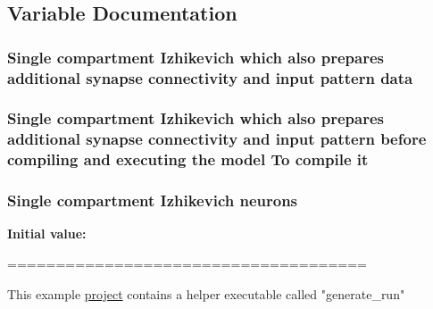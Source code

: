 \subsection{Variable Documentation}
\hypertarget{userproject_2OneComp__project_2README_8txt_a1493f995b682ed3e1bb3433b226ad309}{
\subsubsection[{data}]{\setlength{\rightskip}{0pt plus 5cm}Single compartment Izhikevich which also prepares additional synapse connectivity and input pattern data}}\label{userproject_2OneComp__project_2README_8txt_a1493f995b682ed3e1bb3433b226ad309}
\hypertarget{userproject_2OneComp__project_2README_8txt_a02e2c25b919353f28335b274ab672306}{
\subsubsection[{it}]{\setlength{\rightskip}{0pt plus 5cm}Single compartment Izhikevich which also prepares additional synapse connectivity and input pattern before compiling and executing the {\bf model} To compile it}}\label{userproject_2OneComp__project_2README_8txt_a02e2c25b919353f28335b274ab672306}
\hypertarget{userproject_2OneComp__project_2README_8txt_ac7a6d74e1c2be02dc4098eb4c1651e97}{
\subsubsection[{neurons}]{\setlength{\rightskip}{0pt plus 5cm}Single compartment Izhikevich neurons}}\label{userproject_2OneComp__project_2README_8txt_ac7a6d74e1c2be02dc4098eb4c1651e97}
{\bfseries Initial value\+:}
\begin{DoxyCode}
=====================================

This example \hyperlink{userproject_2MBody1__project_2README_8txt_a6be7686af1c095c33166a32d892865dc}{project} contains a helper executable called \textcolor{stringliteral}{"generate\_run"}
\end{DoxyCode}
